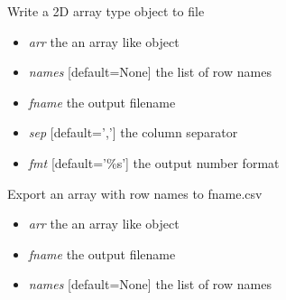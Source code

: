 \documentclass[a4paper,11pt,english]{sphinxmanual}
\begin{document}
\begin{fulllineitems}
\label{modules_doc:cbmpy.CBTools.exportLabelledArray}
Write a 2D array type object to file
\begin{itemize}
\item {} 
\emph{arr} the an array like object

\item {} 
\emph{names} {[}default=None{]} the list of row names

\item {} 
\emph{fname} the output filename

\item {} 
\emph{sep} {[}default=','{]} the column separator

\item {} 
\emph{fmt} {[}default='\%s'{]} the output number format

\end{itemize}

\end{fulllineitems}


\begin{fulllineitems}
\label{modules_doc:cbmpy.CBTools.exportLabelledArray2CSV}
Export an array with row names to fname.csv
\begin{itemize}
\item {} 
\emph{arr} the an array like object

\item {} 
\emph{fname} the output filename

\item {} 
\emph{names} {[}default=None{]} the list of row names

\end{itemize}

\end{fulllineitems}

\end{document}
